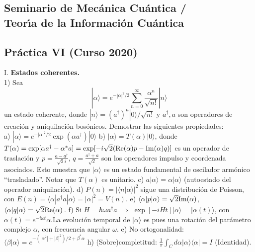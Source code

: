 \documentclass[12pt]{article}
\begin{document}
\begin{center}
\subsection*{Seminario de Mec\'anica Cu\'antica / \\Teor\'{\i}a de la Informaci\'on Cu\'antica}
\subsection*{Pr\'actica VI (Curso 2020)}
\end{center}
I. {\bf Estados coherentes.}\\ 
1) Sea 	
\[|\alpha\rangle=e^{-|\alpha|^2/2}\sum_{n=0}^\infty\frac{\alpha^n}{\sqrt{n!}}|n\rangle\] 
un estado coherente, donde $|n\rangle=(a^\dagger)^n|0\rangle/\sqrt{n!}$ y $a^\dagger,a$ son operadores de creaci\'on y aniquilaci\'on bos\'onicos. Demostrar las siguientes propiedades:\hfill\break \\
a) $|\alpha\rangle=e^{-|\alpha|^2/2}\exp(\alpha a^\dagger)|0\rangle$\hfill\break
b) $|\alpha\rangle=T(\alpha)|0\rangle$, donde $T(\alpha)=\exp[\alpha a^\dagger-\alpha^*a]
=\exp[-i\sqrt{2}({\rm Re}(\alpha) p-{\rm Im}(\alpha) q)]$ es un operador de 
traslaci\'on y $p=\frac{a-a^\dagger}{\sqrt{2}i}$, $q=\frac{a^\dagger+a}{\sqrt{2}}$ 
son los operadores impulso y coordenada asociados. Esto  muestra que $|\alpha\rangle$ es 
un estado fundamental de oscilador arm\'onico ``trasladado''. Notar que $T(\alpha)$ es unitario.\hfill\break
c)  $a|\alpha\rangle=\alpha|\alpha\rangle$ (autoestado del operador aniquilaci\'on). \hfill\break
d) $P(n)=|\langle n|\alpha\rangle|^2$ sigue una distribuci\'on de Poisson, 
con $E(n)=\langle \alpha|a^\dagger a|\alpha\rangle=|\alpha|^2=V(n)$. 
\hfill\break 
e) $\langle\alpha|p|\alpha\rangle=\sqrt{2}{\rm Im}(\alpha)$,  
$\langle\alpha|q|\alpha\rangle=\sqrt{2}{\rm Re}(\alpha)$\,.\hfill\break 
f) Si $H=\hbar\omega a^\dagger a$ $\Rightarrow$ $\exp[-iHt]|\alpha\rangle=|\alpha(t)\rangle$, 
con $\alpha(t)=e^{-i\omega t}\alpha$.\hfill\break La evoluci\'on temporal de $|\alpha\rangle$ 
es pues una rotaci\'on del par\'ametro complejo $\alpha$, con frecuencia angular
 $\omega$.
\hfill\break
e) No ortogonalidad: $\langle\beta|\alpha\rangle=e^{-(|\alpha^2|+|\beta|^2)/2+\beta^*\alpha}$\hfill\break
h) (Sobre)completitud: $\frac{1}{\pi}\int_{C}d\alpha|\alpha\rangle\langle\alpha|=I$ (Identidad).\hfill\break 
\end{document}
